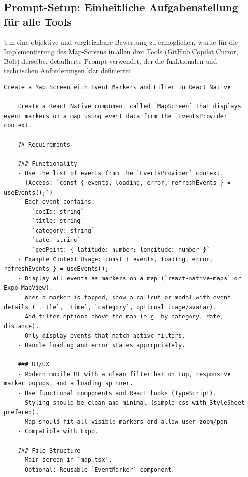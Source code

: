 
\subsection{Prompt-Setup: Einheitliche Aufgabenstellung für alle Tools}
\label{sec:prompt-setup}

Um eine objektive und vergleichbare Bewertung zu ermöglichen, wurde für die
Implementierung des Map-Screens in allen drei Tools (GitHub Copilot,Cursor,
Bolt) derselbe, detaillierte Prompt verwendet, der die funktionalen und
technischen Anforderungen klar definierte:

\begin{lstlisting}[]
    Create a Map Screen with Event Markers and Filter in React Native
    
    Create a React Native component called `MapScreen` that displays event markers on a map using event data from the `EventsProvider` context.
    
    ## Requirements
    
    ### Functionality
    - Use the list of events from the `EventsProvider` context.  
      (Access: `const { events, loading, error, refreshEvents } = useEvents();`)
    - Each event contains:
      - `docId: string`
      - `title: string`
      - `category: string`
      - `date: string`
      - `geoPoint: { latitude: number; longitude: number }`
    - Example Context Usage: const { events, loading, error, refreshEvents } = useEvents();
    - Display all events as markers on a map (`react-native-maps` or Expo MapView).
    - When a marker is tapped, show a callout or modal with event details (`title`, `time`, `category`, optional image/avatar).
    - Add filter options above the map (e.g. by category, date, distance).  
      Only display events that match active filters.
    - Handle loading and error states appropriately.
    
    ### UI/UX
    - Modern mobile UI with a clean filter bar on top, responsive marker popups, and a loading spinner.
    - Use functional components and React hooks (TypeScript).
    - Styling should be clean and minimal (simple css with StyleSheet prefered).
    - Map should fit all visible markers and allow user zoom/pan.
    - Compatible with Expo.
    
    ### File Structure
    - Main screen in `map.tsx`.
    - Optional: Reusable `EventMarker` component.
    

\end{lstlisting}
